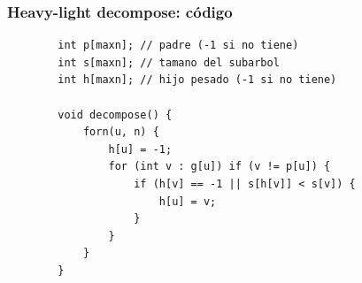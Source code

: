 \begin{frame}[fragile]
  \frametitle{Heavy-light decompose: código}

\begin{lstlisting}
        int p[maxn]; // padre (-1 si no tiene)
        int s[maxn]; // tamano del subarbol
        int h[maxn]; // hijo pesado (-1 si no tiene)
        
        void decompose() {
            forn(u, n) {
                h[u] = -1;
                for (int v : g[u]) if (v != p[u]) {
                    if (h[v] == -1 || s[h[v]] < s[v]) {
                        h[u] = v;
                    }
                }
            }
        }
\end{lstlisting}
\end{frame}
